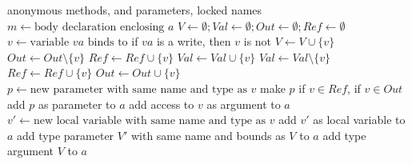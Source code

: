 \begin{algorithm}[p]
\caption{$\refactoring{Close over Variables}(a \colon \type{AnonymousMethod})$}
\label{alg:CloseOverVariables}
\begin{algorithmic}[1]
\REQUIRE
\ENSURE anonymous methods,  and  parameters,
locked names
\medskip
\STATE $m \leftarrow \text{body declaration enclosing $a$}$
\STATE $V \leftarrow \emptyset; \mathit{Val} \leftarrow \emptyset;
\mathit{Out} \leftarrow \emptyset; \mathit{Ref} \leftarrow \emptyset$
  \STATE $v \leftarrow \text{variable $va$ binds to}$
  \STATE \assert if $va$ is a write, then $v$ is not 
    \STATE $V \leftarrow V\cup\{v\}$
        \STATE $\mathit{Out} \leftarrow \mathit{Out}\setminus\{v\}$
        \STATE $\mathit{Ref} \leftarrow \mathit{Ref}\cup\{v\}$
        \STATE $\mathit{Val} \leftarrow \mathit{Val}\cup\{v\}$
      \ENDIF
    \ENDIF
        \STATE $\mathit{Val} \leftarrow \mathit{Val}\setminus\{v\}$
        \STATE $\mathit{Ref} \leftarrow \mathit{Ref}\cup\{v\}$
        \STATE $\mathit{Out} \leftarrow \mathit{Out}\cup\{v\}$
      \ENDIF
    \ENDIF
  \ENDIF
\ENDFOR
{}
    \STATE $p \leftarrow \text{new parameter with same name and type as $v$}$
    \STATE make $p$  if $v\in \mathit{Ref}$,  if $v\in \mathit{Out}$
    \STATE add $p$ as parameter to $a$
    \STATE add access to $v$ as argument to $a$
  \ELSE
    \STATE $v' \leftarrow \text{new local variable with same name and type as $v$}$
    \STATE add $v'$ as local variable to $a$
  \ENDIF
\ENDFOR
{}
  \STATE add type parameter $V'$ with same name and bounds as $V$ to $a$
  \STATE add type argument $V$ to $a$
\ENDFOR
\end{algorithmic}
\end{algorithm}



